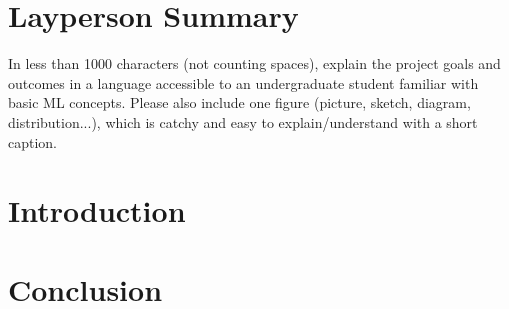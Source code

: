 \documentclass[NOTE, disdraft=true, UKenglish]{\DISCDTLATEXPATH UCLCDTDISdoc}
\begin{document}
\maketitle

\tableofcontents

\clearpage


\newpage
\section{Layperson Summary}
\label{sec:summary}
In less than 1000 characters (not counting spaces), explain the project goals and outcomes in a language accessible to an undergraduate student familiar with basic ML concepts. Please also include one figure (picture, sketch, diagram, distribution...), which is catchy and easy to explain/understand with a short caption.

\newpage
\section{Introduction}
\label{sec:introduction}
%

\section{Conclusion}
\label{sec:conclusion}
%
\end{document}
